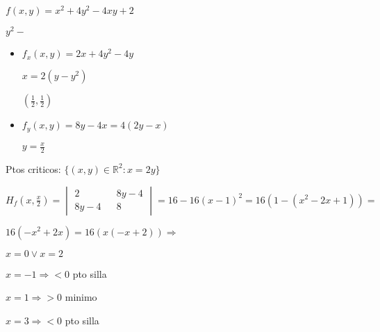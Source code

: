 \documentclass[../practica_06.tex]{subfiles}
\begin{document}
    $f(x,y) = x^2 + 4y^2 - 4xy + 2 $

    $ y^2- $

    \begin{itemize}
        \item $f_x(x,y) = 2x + 4y^2 - 4y $
        
            $ x = 2(y-y^2)$

            $ (\frac{1}{2}, \frac{1}{2}) $

        \item $f_y(x,y) = 8y - 4x = 4(2y - x)$
        
            $ y = \frac{x}{2}$

    \end{itemize}

    Ptos criticos: $\{(x,y) \in \mathbb{R}^2 : x = 2y\}$

    $H_f(x,\frac{x}{2}) = \begin{vmatrix}
        2 && 8y - 4\\
        8y - 4 && 8
    \end{vmatrix} = 16 - 16(x-1)^2 = 16(1 - (x^2 -2x +1) ) = $

    $ 16(-x^2 + 2x) = 16(x(-x + 2)) \Rightarrow$

    $ x = 0 \vee x = 2 $

    $ x = -1 \Rightarrow < 0 $ pto silla

    $ x = 1 \Rightarrow > 0 $ minimo

    $ x = 3 \Rightarrow < 0 $ pto silla
\end{document}

